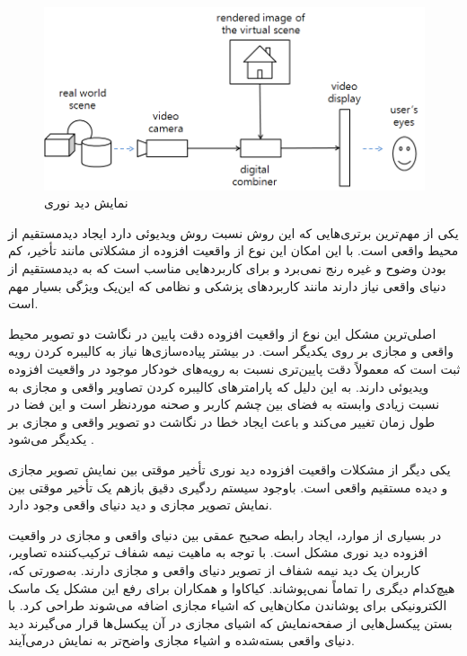 \begin{figure}
	\centering
	\includegraphics[width=1\linewidth]{image/opticalview}
	\caption {نمایش دید نوری \cite{Billinghurst}}
	\label{fig:optical}
\end{figure}

یکی از مهم‌ترین برتری‌هایی که این روش نسبت روش ویدیوئی دارد ایجاد دیدمستقیم از محیط واقعی است. با این امکان این نوع از واقعیت افزوده از مشکلاتی مانند تأخیر، کم بودن وضوح و غیره رنج نمی‌برد و برای کاربردهایی مناسب است که به دیدمستقیم از دنیای واقعی نیاز دارند مانند کاربردهای پزشکی و نظامی که این‌یک ویژگی بسیار مهم است.

اصلی‌ترین مشکل این نوع از واقعیت افزوده دقت پایین در نگاشت دو تصویر محیط واقعی و مجازی بر روی یکدیگر است. در بیشتر پیاده‌سازی‌ها نیاز به کالیبره کردن رویه ثبت است که معمولاً دقت پایین‌تری نسبت به رویه‌های خودکار موجود در واقعیت افزوده ویدیوئی دارند. به این دلیل که پارامترهای کالیبره کردن تصاویر واقعی و مجازی به نسبت زیادی وابسته به فضای بین چشم کاربر و صحنه موردنظر است و این فضا در طول زمان تغییر می‌کند و باعث ایجاد خطا در نگاشت دو تصویر واقعی و مجازی بر یکدیگر می‌شود \cite{Billinghurst}.

یکی دیگر از مشکلات واقعیت افزوده دید نوری تأخیر موقتی بین نمایش تصویر مجازی و دیده مستقیم واقعی است. باوجود سیستم ردگیری دقیق بازهم یک تأخیر موقتی بین نمایش تصویر مجازی و دید دنیای واقعی وجود دارد.

در بسیاری از موارد، ایجاد رابطه صحیح عمقی بین دنیای واقعی و مجازی در واقعیت افزوده دید نوری مشکل است. با توجه به ماهیت نیمه شفاف ترکیب‌کننده تصاویر، کاربران یک دید نیمه شفاف از تصویر دنیای واقعی و مجازی دارند. به‌صورتی که، هیچ‌کدام دیگری را تماماً نمی‌پوشاند. کیاکاوا و همکاران\cite{Kiyokawa} برای رفع این مشکل یک ماسک الکترونیکی برای پوشاندن مکان‌هایی که اشیاء مجازی اضافه می‌شوند طراحی کرد. با بستن پیکسل‌هایی از صفحه‌نمایش که اشیای مجازی در آن پیکسل‌ها قرار می‌گیرند دید دنیای واقعی بسته‌شده و اشیاء مجازی واضح‌تر به نمایش درمی‌آیند.

